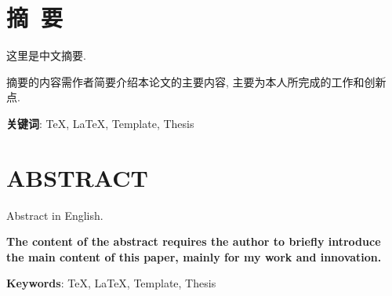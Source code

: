 \newpage

\setcounter{page}{1} %

{
\let\clearpage\relax%
\chapter*{摘\ 要}
}

这里是中文摘要. 

摘要的内容需作者简要介绍本论文的主要内容, 主要为本人所完成的工作和创新
点. 

\vspace{8mm}
\textbf{关键词}: \TeX, \LaTeX, Template, Thesis

\newpage
{
\let\clearpage\relax%
\chapter*{ABSTRACT}
}

Abstract in English.

\textbf{The content of the abstract requires the author to briefly introduce the main content of this paper, mainly for my work and innovation.}

\vspace{8mm}

\textbf{Keywords}: \TeX, \LaTeX, Template, Thesis

